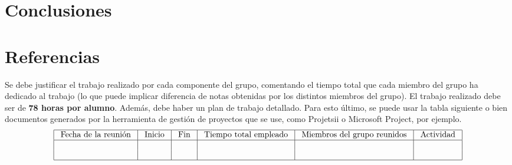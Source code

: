 \documentclass{pid}
\begin{document}
\section{Conclusiones}

\section{Referencias}

\newpage
{}


Se debe justificar el trabajo realizado por cada componente del grupo, comentando el tiempo total que cada miembro del grupo ha dedicado al trabajo (lo que puede implicar diferencia de notas obtenidas por los distintos miembros del grupo). El trabajo realizado debe ser de {\bf 78 horas por alumno}. Además, debe haber un plan de trabajo detallado. Para esto último, se puede usar la tabla siguiente o bien documentos generados por la herramienta de gestión de proyectos que se use, como Projetsii o Microsoft Project, por ejemplo.
$$\begin{array}{|c|c|c|c|c|c|}
\hline 
\mbox{ Fecha de la
reunión }
& \mbox{ Inicio }
& \mbox{ Fin }
&\mbox{ Tiempo
total
empleado }
&	\mbox{ 
Miembros
del grupo
reunidos }
&	\mbox{ Actividad }\\\hline
\mbox{ }&\mbox{}&\mbox{ }&\mbox{}&\mbox{ }&\mbox{}\\
\mbox{ }&\mbox{}&\mbox{ }&\mbox{}&\mbox{ }&\mbox{}\\\hline\end{array}$$
\end{document}
